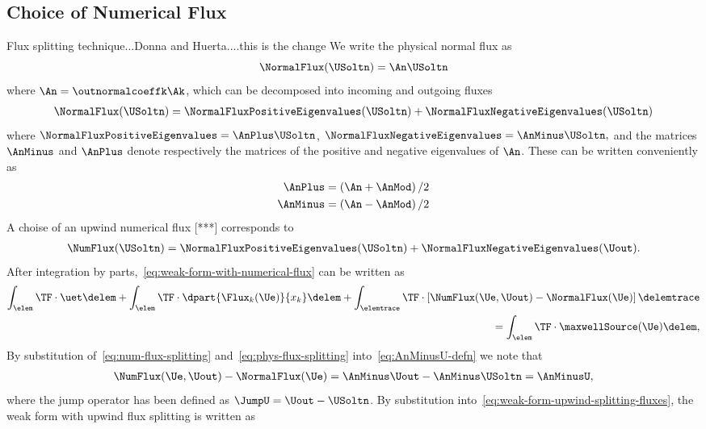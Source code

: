 \subsection{Choice of Numerical Flux}
Flux splitting technique...Donna and Huerta....this is the change
We write the physical normal flux as
$$
\NormalFlux(\USoltn) = \An \USoltn
$$
where $\An = \outnormalcoeffk \Ak$, which can be decomposed into incoming and outgoing fluxes
\begin{align}
\NormalFlux(\USoltn) = \NormalFluxPositiveEigenvalues(\USoltn) + \NormalFluxNegativeEigenvalues(\USoltn)
\label{eq:phys-flux-splitting}
\end{align}
where $ \NormalFluxPositiveEigenvalues = \AnPlus \USoltn$, $\NormalFluxNegativeEigenvalues = \AnMinus \USoltn, $ and the matrices $\AnMinus$ and $\AnPlus$ denote respectively the matrices of the positive and negative eigenvalues of $\An$. These can be written conveniently as
\begin{align}
  \label{eq:AnMinus-AnPlus-Definition}
\AnPlus &= \left( \An + \AnMod \right) / 2   \\
\AnMinus &= \left( \An - \AnMod \right) / 2
\end{align}
A choise of an upwind numerical flux [***] corresponds to
\begin{align}
\NumFlux(\USoltn) = \NormalFluxPositiveEigenvalues(\USoltn) + \NormalFluxNegativeEigenvalues(\Uout).
\label{eq:num-flux-splitting}
\end{align}
After integration by parts,~\eqref{eq:weak-form-with-numerical-flux} can be written as
\begin{align*}
\int_{\elem} \TF \cdot \uet \delem  + \int_{\elem} \TF \cdot \dpart{\Flux_{k}(\Ue)}{x_k} \delem + \int_{\elemtrace} \TF \cdot \left[ \NumFlux(\Ue,\Uout) - \NormalFlux(\Ue) \right] \delemtrace \\
= \int_{\elem} \TF  \cdot \maxwellSource(\Ue) \delem,
\label{eq:weak-form-upwind-splitting-fluxes}
\end{align*}
By substitution of~\eqref{eq:num-flux-splitting} and~\eqref{eq:phys-flux-splitting} into~\eqref{eq:AnMinusU-defn} we note that
\begin{align*}
  \NumFlux(\Ue,\Uout) - \NormalFlux(\Ue) = \AnMinus \Uout - \AnMinus \USoltn = \AnMinusU,
\end{align*}
where the jump operator has been defined as $\JumpU = \Uout - \USoltn$. By substitution into~\eqref{eq:weak-form-upwind-splitting-fluxes}, the weak form with upwind flux splitting is written as
